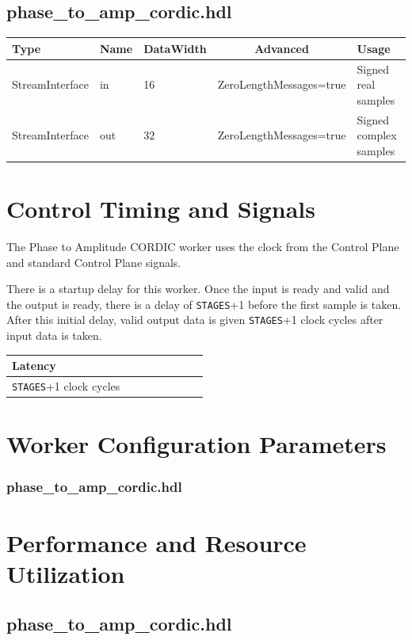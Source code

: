 \documentclass{article}
\def\comp{phase\_to\_amp\_cordic}
\edef\ecomp{phase_to_amp_cordic}
\begin{document}
\begin{landscape}
	\subsection*{\comp.hdl}
	\begin{scriptsize}
		\begin{tabular}{|M{2cm}|M{1.5cm}|M{4cm}|c|M{10cm}|}
			\hline
			Type            & Name & DataWidth & Advanced                & Usage                  \\
			\hline
			StreamInterface & in   & 16        & ZeroLengthMessages=true & Signed real samples    \\
			\hline
			StreamInterface & out  & 32        & ZeroLengthMessages=true & Signed complex samples \\
			\hline
		\end{tabular}
	\end{scriptsize}
\end{landscape}

\section*{Control Timing and Signals}
\begin{flushleft}
	The Phase to Amplitude CORDIC worker uses the clock from the Control Plane and standard Control Plane signals.\medskip

	There is a startup delay for this worker. Once the input is ready and valid and the output is ready, there is a delay of \verb+STAGES++1 before the first sample is taken. After this initial delay, valid output data is given \verb+STAGES++1 clock cycles after input data is taken.

	\begin{tabular}{|M{4.5cm}|M{1cm}|M{1cm}|M{1.5cm}|M{2cm}|M{1cm}|M{1cm}|M{2.5cm}|}
		\hline
		Latency                      \\
		\hline
		\verb+STAGES++1 clock cycles \\
		\hline
	\end{tabular}
\end{flushleft}

\begin{landscape}
\section*{Worker Configuration Parameters}
\subsubsection*{\comp.hdl}

\section*{Performance and Resource Utilization}
\subsection*{\comp.hdl}

\end{landscape}
\newpage
\end{document}
